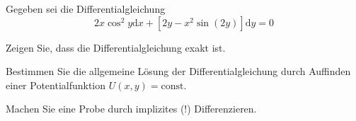 \begin{atiTask}[
  title = Exakte Differentialgleichung
]
  \providecommand{\D}{\mathrm{d}}
  Gegeben sei die Differentialgleichung
  \begin{equation*}
  2x\cos^2y\D x+ [2y-x^2\sin(2y)]\D y=0
  \end{equation*}
  \begin{atiSubtasks}
  \item Zeigen Sie, dass die Differentialgleichung exakt ist.
  \item Bestimmen Sie die allgemeine Lösung der Differentialgleichung durch Auffinden einer Potentialfunktion $U(x,y)=\text{const}$.
  \item Machen Sie eine Probe durch implizites (!) Differenzieren.
  \end{atiSubtasks}

\end{atiTask}
%
